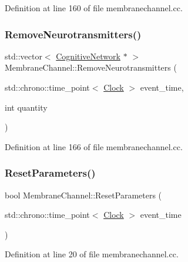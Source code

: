 Definition at line 160 of file membranechannel.\+cc.

\mbox{\label{class_membrane_channel_a37f22ddd877e3be7b353048149a7bbcd}} 
\subsubsection{\texorpdfstring{Remove\+Neurotransmitters()}{RemoveNeurotransmitters()}}
{\footnotesize\ttfamily std\+::vector$<$ \mbox{\hyperlink{class_cognitive_network}{Cognitive\+Network}} $\ast$ $>$ Membrane\+Channel\+::\+Remove\+Neurotransmitters (\begin{DoxyParamCaption}\item[{std\+::chrono\+::time\+\_\+point$<$ \mbox{\hyperlink{universe_8h_a0ef8d951d1ca5ab3cfaf7ab4c7a6fd80}{Clock}} $>$}]{event\+\_\+time,  }\item[{int}]{quantity }\end{DoxyParamCaption})}



Definition at line 166 of file membranechannel.\+cc.

\mbox{\label{class_membrane_channel_a5982040b46efe5e2b824d1cf4dead25e}} 
\subsubsection{\texorpdfstring{Reset\+Parameters()}{ResetParameters()}}
{\footnotesize\ttfamily bool Membrane\+Channel\+::\+Reset\+Parameters (\begin{DoxyParamCaption}\item[{std\+::chrono\+::time\+\_\+point$<$ \mbox{\hyperlink{universe_8h_a0ef8d951d1ca5ab3cfaf7ab4c7a6fd80}{Clock}} $>$}]{event\+\_\+time }\end{DoxyParamCaption})}



Definition at line 20 of file membranechannel.\+cc.

